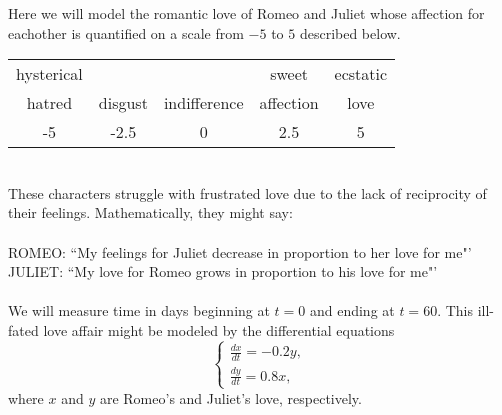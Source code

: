 \documentclass[addpoints, 11pt]{exam}
\begin{document}
\noindent Here we will model the romantic love of Romeo and Juliet whose affection for eachother is quantified on a scale from $-5$ to $5$ described below.
\begin{center}
\begin{tabular}{c c c c c} 
\hline\hline
hysterical & & & sweet & ecstatic \\
hatred & disgust & indifference & affection & love \\ 
\hline 
-5 & -2.5 & 0 & 2.5 & 5 \\ 
\hline\hline
\end{tabular} 
\end{center}
\ \\
These characters struggle with frustrated love due to the lack of reciprocity of their feelings. Mathematically, they might say: \\
\ \\
ROMEO: ``My feelings for Juliet decrease in proportion to her love for me"' \\
JULIET: ``My love for Romeo grows in proportion to his love for me"'\\
\ \\
We will measure time in days beginning at $t=0$ and ending at $t=60$. This ill-fated love affair might be modeled by the differential equations
$$
\begin{cases}
\frac{dx}{dt} = -0.2 y , \\
\frac{dy}{dt} = 0.8 x ,
\end{cases}
$$
where $x$ and $y$ are Romeo's and Juliet's love, respectively. 
\end{document}
